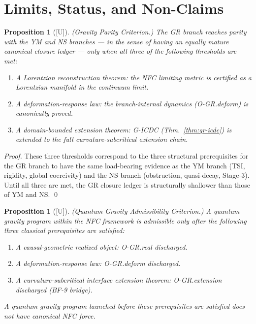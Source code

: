 \documentclass[12pt,oneside]{amsbook}
\theoremstyle{plain}
\newtheorem{proposition}[theorem]{Proposition}
\theoremstyle{definition}
\theoremstyle{remark}
\newcommand{\status}[1]{\textup{[#1]}}
\begin{document}
\section{Limits, Status, and Non-Claims}
\label{sec:limits}

\begin{proposition}[\status{U}]\label{prop:gr-parity}
\textup{(Gravity Parity Criterion.)} The GR branch reaches parity
with the YM and NS branches --- in the sense of having an equally
mature canonical closure ledger --- only when all three of the
following thresholds are met:
\begin{enumerate}[label=\textup{(\arabic*)}]
 \item A Lorentzian reconstruction theorem: the NFC limiting
 metric is certified as a Lorentzian manifold in the
 continuum limit.
 \item A deformation-response law: the branch-internal dynamics
 (O-GR.deform) is canonically proved.
 \item A domain-bounded extension theorem: G-ICDC
 (Thm.~\ref{thm:gr-icdc}) is extended to the full
 curvature-subcritical extension chain.
\end{enumerate}
\end{proposition}

\begin{proof}
These three thresholds correspond to the three structural
prerequisites for the GR branch to have the same load-bearing
evidence as the YM branch (TSI, rigidity, global coercivity) and
the NS branch (obstruction, quasi-decay, Stage-3). Until all
three are met, the GR closure ledger is structurally shallower
than those of YM and NS.
\qed
\end{proof}

\begin{proposition}[\status{U}]\label{prop:qg-criterion}
\textup{(Quantum Gravity Admissibility Criterion.)} A quantum
gravity program within the NFC framework is admissible only after
the following three classical prerequisites are satisfied:
\begin{enumerate}[label=\textup{(\arabic*)}]
 \item A causal-geometric realized object: O-GR.real discharged.
 \item A deformation-response law: O-GR.deform discharged.
 \item A curvature-subcritical interface extension theorem:
 O-GR.extension discharged (BF-9 bridge).
\end{enumerate}
A quantum gravity program launched before these prerequisites are
satisfied does not have canonical NFC force.
\end{proposition}
\end{document}
